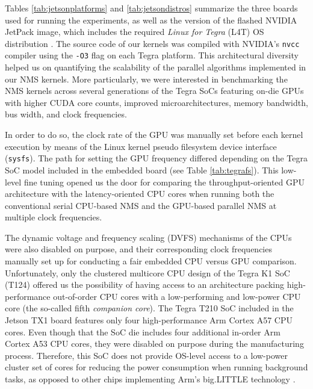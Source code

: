 Tables \ref{tab:jetsonplatforms} and \ref{tab:jetsondistros} summarize the three boards used for running the 
experiments, as well as the version of the flashed NVIDIA JetPack image, which includes the required \emph{Linux for Tegra} (L4T) 
OS distribution \cite{nvidial4t}. The source code of our kernels was compiled with NVIDIA's \texttt{nvcc} compiler using the \texttt{-O3} flag 
on each Tegra platform. This architectural diversity helped us on quantifying the scalability of the parallel algorithms 
implemented in our NMS kernels. More particularly, we were interested in benchmarking the NMS kernels across several generations of 
the Tegra SoCs featuring on-die GPUs with higher CUDA core counts, improved microarchitectures, memory bandwidth, bus width, 
and clock frequencies. 

In order to do so, the clock rate of the GPU was manually set before each kernel execution by means of the Linux kernel 
pseudo filesystem device interface (\texttt{sysfs}). The path for setting the GPU frequency differed depending on the 
Tegra SoC model included in the embedded board (see Table \ref{tab:tegrafs}). This low-level fine tuning opened us the door 
for comparing the throughput-oriented GPU architecture with the latency-oriented CPU cores when running both the conventional 
serial CPU-based NMS and the GPU-based parallel NMS at multiple clock frequencies.

The dynamic voltage and frequency scaling (DVFS) mechanisms of the CPUs were also disabled on purpose, and their corresponding clock 
frequencies manually set up for conducting a fair embedded CPU versus GPU comparison. Unfortunately, only the clustered multicore 
CPU design of the Tegra K1 SoC (T124) offered us the possibility of having access to an architecture packing high-performance  
out-of-order CPU cores with a low-performing and low-power CPU core (the so-called fifth \emph{companion core}). The Tegra T210 SoC 
included in the Jetson TX1 board features only four high-performance Arm Cortex A57 CPU cores. Even though that the SoC die includes 
four additional in-order Arm Cortex A53 CPU cores, they were disabled on purpose during the manufacturing process. Therefore, this SoC does not provide 
OS-level access to a low-power cluster set of cores for reducing the power consumption when running background tasks, as opposed to other chips 
implementing Arm's big.LITTLE technology \cite{armbiglittle}.

